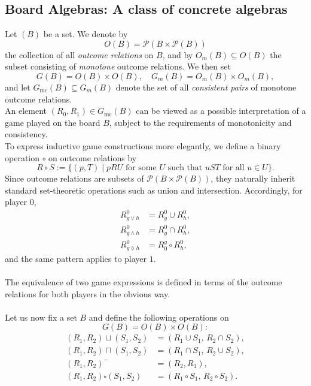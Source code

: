 \documentclass[12pt]{article}
\begin{document}
\subsection{Board Algebras: A class of concrete algebras} 
Let $( B )$ be a set. We denote by 
\[
O(B) = \mathcal{P}(B \times \mathcal{P}(B))
\]
the collection of all \emph{outcome relations} on \( B \), and by \( O_m(B) \subseteq O(B) \) the subset consisting of \emph{monotone} outcome relations.  
We then set
\[
G(B) = O(B) \times O(B), \quad 
G_m(B) = O_m(B) \times O_m(B),
\]
and let \( G_{\mathrm{mc}}(B) \subseteq G_m(B) \) denote the set of all \emph{consistent pairs} of monotone outcome relations.\\
An element \( (R_0, R_1) \in G_{\mathrm{mc}}(B) \) can be viewed as a possible interpretation of a game played on the board \( B \), subject to the requirements of monotonicity and consistency.\\
To express inductive game constructions more elegantly, we define a binary operation \( \circ \) on outcome relations by
\[
R \circ S := \{ (p, T) \mid pR U \text{ for some } U \text{ such that } uS T \text{ for all } u \in U \}.
\]
Since outcome relations are subsets of \( \mathcal{P}(B \times \mathcal{P}(B)) \), they naturally inherit standard set-theoretic operations such as union and intersection.  
Accordingly, for player \( 0 \),
\[
\begin{aligned}
R_{g \lor h}^0 &= R_g^0 \cup R_h^{0}, \\
R_{g \land h}^0 &= R_g^0 \cap R_h^0, \\
R_{g \lozenge h}^0 &= R^g_0 \circ R_h^0,
\end{aligned}
\]
and the same pattern applies to player \( 1 \).\\ \\
The equivalence of two game expressions is defined in terms of the outcome relations for both players in the obvious way. \\ \\ 
Let us now fix a set \( B \) and define the following operations on
\[
G(B) = O(B) \times O(B):
\]
\[
\begin{aligned}
(R_1, R_2) \sqcup (S_1, S_2) &= (R_1 \cup S_1,\, R_2 \cap S_2), \\
(R_1, R_2) \sqcap (S_1, S_2) &= (R_1 \cap S_1,\, R_2 \cup S_2), \\
(R_1, R_2)^{-} &= (R_2, R_1), \\
(R_1, R_2) \square (S_1, S_2) &= (R_1 \circ S_1,\, R_2 \circ S_2).
\end{aligned}
\] \\
\end{document}
